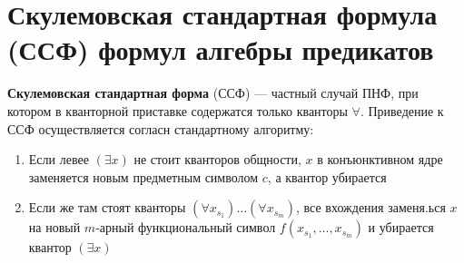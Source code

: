 \section{Скулемовская стандартная формула (ССФ) формул алгебры предикатов}
\dftion \textbf{Скулемовская стандартная форма} (ССФ) --- частный случай ПНФ, при котором в кванторной приставке содержатся только кванторы $\forall$. Приведение к ССФ осуществляется согласн стандартному алгоритму:
\begin{enumerate}
    \item Если левее $(\exists x)$ не стоит кванторов общности, $x$ в конъюнктивном ядре заменяется новым предметным символом $c$, а квантор убирается
    \item Если же там стоят кванторы $(\forall x_{s_1})\dots(\forall x_{s_m})$, все вхождения заменя.ься $x$ на новый $m$-арный функциональный символ $f(x_{s_1},\dots,x_{s_m})$ и убирается квантор $(\exists x)$
\end{enumerate}